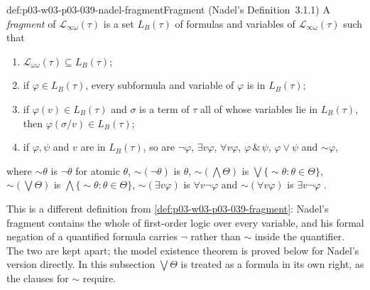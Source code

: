 \begin{hbdefinition}{def:p03-w03-p03-039-nadel-fragment}{Fragment (Nadel's Definition~3.1.1)}
A \emph{fragment} of \(\mathscr L_{\infty\omega}(\tau)\) is a set \(L_B(\tau)\)
of formulas and variables of \(\mathscr L_{\infty\omega}(\tau)\) such that
\begin{enumerate}
\item[(i)] \(\mathscr L_{\omega\omega}(\tau)\subseteq L_B(\tau)\);
\item[(ii)] if \(\varphi\in L_B(\tau)\), every subformula and variable of
      \(\varphi\) is in \(L_B(\tau)\);
\item[(iii)] if \(\varphi(v)\in L_B(\tau)\) and \(\sigma\) is a term of
      \(\tau\) all of whose variables lie in \(L_B(\tau)\), then
      \(\varphi(\sigma/v)\in L_B(\tau)\);
\item[(iv)] if \(\varphi,\psi\) and \(v\) are in \(L_B(\tau)\), so are
      \(\neg\varphi\), \(\exists v\varphi\), \(\forall v\varphi\),
      \(\varphi\,\&\,\psi\), \(\varphi\vee\psi\) and \({\sim}\varphi\),
\end{enumerate}
where \({\sim}\theta\) is \(\neg\theta\) for atomic \(\theta\),
\({\sim}(\neg\theta)\) is \(\theta\), \({\sim}(\bigwedge\Theta)\) is
\(\bigvee\{{\sim}\theta:\theta\in\Theta\}\), \({\sim}(\bigvee\Theta)\) is
\(\bigwedge\{{\sim}\theta:\theta\in\Theta\}\), \({\sim}(\exists v\varphi)\)
is \(\forall v\neg\varphi\) and \({\sim}(\forall v\varphi)\) is
\(\exists v\neg\varphi\) \cite[Def.~3.1.1, pp.~278--279]{Nadel1985Admissible}.
\end{hbdefinition}

This is a different definition from \cref{def:p03-w03-p03-039-fragment}:
Nadel's fragment contains the whole of first-order logic over every
variable, and his formal negation of a quantified formula carries
\(\neg\) rather than \({\sim}\) inside the quantifier. The two are kept
apart; the model existence theorem is proved below for Nadel's version
directly. In this subsection \(\bigvee\Theta\) is treated as a formula in its
own right, as the clauses for \({\sim}\) require.


